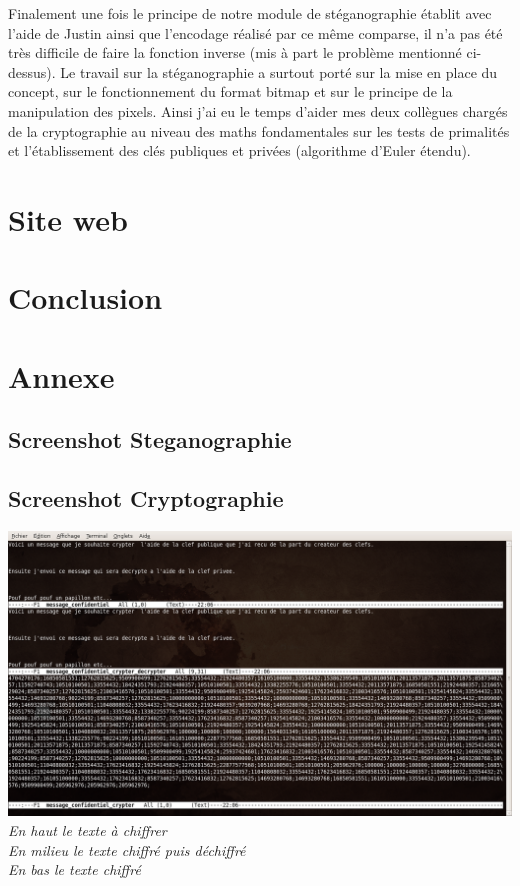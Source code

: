\documentclass[a4paper,12pt]{article}
\begin{document}
Finalement une fois le principe de notre module de stéganographie établit avec l’aide de Justin ainsi que l’encodage réalisé par ce même comparse, il n’a pas été très difficile de faire la fonction inverse (mis à part le problème mentionné ci-dessus). Le travail sur la stéganographie a surtout porté sur la mise en place du concept, sur le fonctionnement du format bitmap et sur le principe de la manipulation des pixels. Ainsi j’ai eu le temps d’aider mes deux collègues chargés de la cryptographie au niveau des maths fondamentales sur les tests de primalités et l’établissement des clés publiques et privées (algorithme d’Euler étendu).

	
		\newpage
	\section{Site web}
	\newpage
	\section{Conclusion}
	\newpage
	\section{Annexe}
		\subsection {Screenshot Steganographie}
		\newpage
		\begin{landscape}
		\subsection {Screenshot Cryptographie}
			\begin{center}
				\includegraphics[scale=0.42]{cryptage.jpg}\\
					\textit{En haut le texte à chiffrer}\\ 
					\textit{En milieu le texte chiffré puis déchiffré}\\ 
					\textit{En bas le texte chiffré}\\ 
			\end{center}
		\end{landscape}
		\newpage
\end{document}
